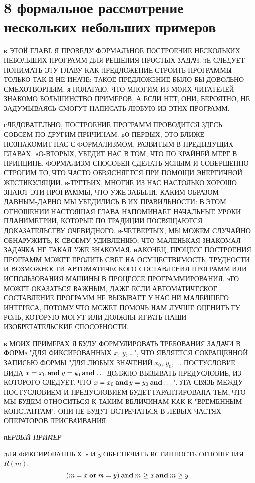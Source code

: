 

\chapter{8 формальное рассмотрение нескольких небольших примеров}
в ЭТОЙ ГЛАВЕ Я ПРОВЕДУ ФОРМАЛЬНОЕ ПОСТРОЕНИЕ НЕСКОЛЬКИХ НЕБОЛЬШИХ 
ПРОГРАММ ДЛЯ РЕШЕНИЯ ПРОСТЫХ ЗАДАЧ. нЕ СЛЕДУЕТ ПОНИМАТЬ ЭТУ ГЛАВУ 
КАК ПРЕДЛОЖЕНИЕ СТРОИТЬ ПРОГРАММЫ ТОЛЬКО ТАК И НЕ ИНАЧЕ: ТАКОЕ 
ПРЕДЛОЖЕНИЕ БЫЛО БЫ ДОВОЛЬНО  СМЕХОТВОРНЫМ. я ПОЛАГАЮ, ЧТО МНОГИМ 
ИЗ МОИХ ЧИТАТЕЛЕЙ ЗНАКОМО БОЛЬШИНСТВО ПРИМЕРОВ, А ЕСЛИ НЕТ, ОНИ, 
ВЕРОЯТНО, НЕ ЗАДУМЫВАЯСЬ СМОГУТ НАПИСАТЬ ЛЮБУЮ ИЗ ЭТИХ ПРОГРАММ. 

сЛЕДОВАТЕЛЬНО, ПОСТРОЕНИЕ ПРОГРАММ ПРОВОДИТСЯ ЗДЕСЬ СОВСЕМ ПО 
ДРУГИМ ПРИЧИНАМ. вО-ПЕРВЫХ, ЭТО БЛИЖЕ ПОЗНАКОМИТ НАС С ФОРМАЛИЗМОМ, 
РАЗВИТЫМ В ПРЕДЫДУЩИХ ГЛАВАХ. вО-ВТОРЫХ, УБЕДИТ НАС В ТОМ, ЧТО ПО 
КРАЙНЕЙ МЕРЕ В ПРИНЦИПЕ, ФОРМАЛИЗМ СПОСОБЕН СДЕЛАТЬ ЯСНЫМ И 
СОВЕРШЕННО СТРОГИМ ТО, ЧТО ЧАСТО ОБRЯСНЯЕТСЯ ПРИ ПОМОЩИ ЭНЕРГИЧНОЙ 
ЖЕСТИКУЛЯЦИИ. в-ТРЕТЬИХ, МНОГИЕ ИЗ НАС НАСТОЛЬКО ХОРОШО ЗНАЮТ ЭТИ 
ПРОГРАММЫ, ЧТО УЖЕ ЗАБЫЛИ, КАКИМ ОБРАЗОМ ДАВНЫМ-ДАВНО МЫ УБЕДИЛИСЬ 
В ИХ ПРАВИЛЬНОСТИ: В ЭТОМ ОТНОШЕНИИ НАСТОЯЩАЯ ГЛАВА НАПОМИНАЕТ 
НАЧАЛЬНЫЕ УРОКИ ПЛАНИМЕТРИИ, КОТОРЫЕ ПО ТРАДИЦИИ ПОСВЯЩАЮТСЯ 
ДОКАЗАТЕЛЬСТВУ ОЧЕВИДНОГО. в-ЧЕТВЕРТЫХ, МЫ МОЖЕМ СЛУЧАЙНО 
ОБНАРУЖИТЬ, К СВОЕМУ УДИВЛЕНИЮ, ЧТО МАЛЕНЬКАЯ ЗНАКОМАЯ ЗАДАЧКА НЕ 
ТАКАЯ УЖЕ ЗНАКОМАЯ. нАКОНЕЦ, ПРОЦЕСС ПОСТРОЕНИЯ ПРОГРАММ МОЖЕТ 
ПРОЛИТЬ СВЕТ НА ОСУЩЕСТВИМОСТЬ, ТРУДНОСТИ И ВОЗМОЖНОСТИ 
АВТОМАТИЧЕСКОГО СОСТАВЛЕНИЯ ПРОГРАММ ИЛИ ИСПОЛЬЗОВАНИЯ МАШИНЫ В 
ПРОЦЕССЕ ПРОГРАММИРОВАНИЯ. эТО МОЖЕТ ОКАЗАТЬСЯ ВАЖНЫМ, ДАЖЕ ЕСЛИ 
АВТОМАТИЧЕСКОЕ СОСТАВЛЕНИЕ ПРОГРАММ НЕ ВЫЗЫВАЕТ У НАС НИ МАЛЕЙШЕГО 
ИНТЕРЕСА, ПОТОМУ ЧТО МОЖЕТ ПОМОЧЬ НАМ ЛУЧШЕ ОЦЕНИТЬ ТУ РОЛЬ, 
КОТОРУЮ МОГУТ ИЛИ ДОЛЖНЫ ИГРАТЬ НАШИ ИЗОБРЕТАТЕЛЬСКИЕ СПОСОБНОСТИ.

в МОИХ ПРИМЕРАХ Я БУДУ ФОРМУЛИРОВАТЬ ТРЕБОВАНИЯ ЗАДАЧИ В ФОРМe "ДЛЯ 
ФИКСИРОВАННЫХ $x$, $y$, \dots", ЧТО ЯВЛЯЕТСЯ СОКРАЩЕННОЙ ЗАПИСЬЮ 
ФОРМЫ "ДЛЯ ЛЮБЫХ ЗНАЧЕНИЙ $x_0$, $y_0$, ... ПОСТУСЛОВИЕ ВИДА 
$x=x_0 \mathbin{\bf and} y=y_0 \mathbin{\bf and} \ldots$ ДОЛЖНО ВЫЗЫВАТЬ ПРЕДУСЛОВИЕ, ИЗ 
КОТОРОГО СЛЕДУЕТ, ЧТО $x=x_0 \mathbin{\bf and} y=y_0 \mathbin{\bf and} \ldots$". эТА 
СВЯЗЬ МЕЖДУ ПОСТУСЛОВИЕМ И ПРЕДУСЛОВИЕМ БУДЕТ ГАРАНТИРОВАНА ТЕМ, 
ЧТО МЫ БУДЕМ ОТНОСИТЬСЯ К ТАКИМ ВЕЛИЧИНАМ КАК К "ВРЕМЕННЫМ 
КОНСТАНТАМ"; ОНИ НЕ БУДУТ ВСТРЕЧАТЬСЯ В ЛЕВЫХ ЧАСТЯХ ОПЕРАТОРОВ 
ПРИСВАИВАНИЯ.

{\sl пЕРВЫЙ ПРИМЕР}

дЛЯ ФИКСИРОВАННЫХ $x$ И $y$ ОБЕСПЕЧИТЬ ИСТИННОСТЬ ОТНОШЕНИЯ $R(m)$. 
$$ 
(m=x \mathbin{\bf or} m=y) \mathbin{\bf and} m\ge x \mathbin{\bf and} m\ge y 
$$


